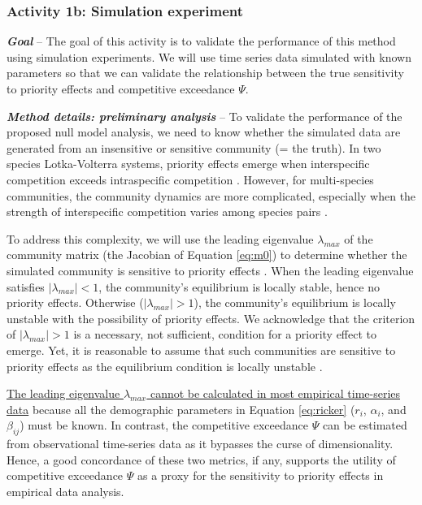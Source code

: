 \documentclass[12pt, class=article, crop=false]{standalone}
\begin{document}
\subsubsection*{Activity 1b: Simulation experiment}

\textbf{\textit{Goal}} -- 
The goal of this activity is to validate the performance of this method using simulation experiments.
We will use time series data simulated with known parameters so that we can validate the relationship between the true sensitivity to priority effects and competitive exceedance $\Psi$.

\textbf{\textit{Method details: preliminary analysis}} -- 
To validate the performance of the proposed null model analysis, we need to know whether the simulated data are generated from an insensitive or sensitive community (= the truth).
In two species Lotka-Volterra systems, priority effects emerge when interspecific competition exceeds intraspecific competition \citep{ke_coexistence_2018}.
However, for multi-species communities, the community dynamics are more complicated, especially when the strength of interspecific competition varies among species pairs \citep{carroll_niche_2011, barabas_chessons_2018}.

To address this complexity, we will use the leading eigenvalue $\lambda_{max}$ of the community matrix (the Jacobian of Equation \ref{eq:m0}) to determine whether the simulated community is sensitive to priority effects \citep{otto_biologists_2011}.
When the leading eigenvalue satisfies $|\lambda_{max}| < 1$, the community's equilibrium is locally stable, hence no priority effects.
Otherwise ($|\lambda_{max}| > 1$), the community's equilibrium is locally unstable with the possibility of priority effects.
We acknowledge that the criterion of $|\lambda_{max}| > 1$ is a necessary, not sufficient, condition for a priority effect to emerge.
Yet, it is reasonable to assume that such communities are sensitive to priority effects as the equilibrium condition is locally unstable  \citep{otto_biologists_2011}. 

\ul{The leading eigenvalue $\lambda_{max}$ cannot be calculated in most empirical time-series data} because all the demographic parameters in Equation \ref{eq:ricker} ($r_i$, $\alpha_i$, and $\beta_{ij}$) must be known.
In contrast, the competitive exceedance $\Psi$ can be estimated from observational time-series data as it bypasses the curse of dimensionality.
Hence, a good concordance of these two metrics, if any, supports the utility of competitive exceedance $\Psi$ as a proxy for the sensitivity to priority effects in empirical data analysis.
\end{document}
